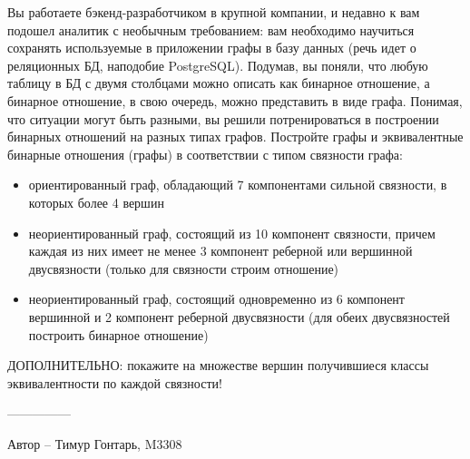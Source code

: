 \question
Вы работаете бэкенд-разработчиком в крупной компании, и недавно к вам подошел аналитик с необычным требованием: вам необходимо научиться сохранять используемые в приложении графы в базу данных (речь идет о реляционных БД, наподобие PostgreSQL). Подумав, вы поняли, что любую таблицу в БД с двумя столбцами можно описать как бинарное отношение, а бинарное отношение, в свою очередь, можно представить в виде графа. Понимая, что ситуации могут быть разными, вы решили потренироваться в построении бинарных отношений на разных типах графов. Постройте графы и эквивалентные бинарные отношения (графы) в соответствии с типом связности графа:

\begin{itemize}
\item ориентированный граф, обладающий 7 компонентами сильной связности, в которых более 4 вершин
\item неориентированный граф, состоящий из 10 компонент связности, причем каждая из них имеет не менее 3 компонент реберной или вершинной двусвязности (только для связности строим отношение)
\item неориентированный граф, состоящий одновременно из 6 компонент вершинной и 2 компонент реберной двусвязности (для обеих двусвязностей построить бинарное отношение)
\end{itemize}
ДОПОЛНИТЕЛЬНО: покажите на множестве вершин получившиеся классы эквивалентности по каждой связности!

---------------

Автор -- Тимур Гонтарь, M3308